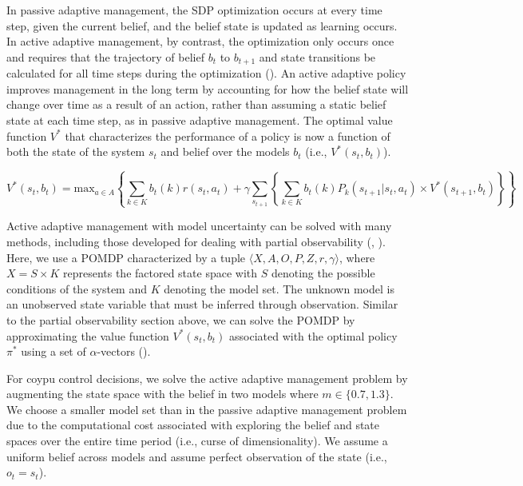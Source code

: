 \documentclass[
  11pt,
  a4paper,
]{article}
\begin{document}
In passive adaptive management, the SDP optimization occurs at every time step, given the current belief, and the belief state is updated as learning occurs. In active adaptive management, by contrast, the optimization only occurs once and requires that the trajectory of belief \(b_t\) to \(b_{t+1}\) and state transitions be calculated for all time steps during the optimization (). An active adaptive policy improves management in the long term by accounting for how the belief state will change over time as a result of an action, rather than assuming a static belief state at each time step, as in passive adaptive management. The optimal value function \(V^*\) that characterizes the performance of a policy is now a function of both the state of the system \(s_t\) and belief over the models \(b_t\) (i.e., \(V^*(s_t, b_t)\)).

\[
V^*(s_t,b_t) = \text{max}_{a \in A} \left\{ \sum_{k \in K}b_t(k)r(s_t, a_t) + \gamma \sum_{s_{t+1}} \left\{\sum_{k\in K}b_t(k)P_k(s_{t+1}|s_t, a_t) \times V^*(s_{t+1},b_t)\right\} \right\}
\]

Active adaptive management with model uncertainty can be solved with many methods, including those developed for dealing with partial observability (, ). Here, we use a POMDP characterized by a tuple \(〈X, A, O, P, Z, r, \gamma〉\), where \(X = S \times K\) represents the factored state space with \(S\) denoting the possible conditions of the system and \(K\) denoting the model set. The unknown model is an unobserved state variable that must be inferred through observation. Similar to the partial observability section above, we can solve the POMDP by approximating the value function \(V^*(s_t,b_t)\) associated with the optimal policy \(\pi^*\) using a set of \(\alpha\)-vectors ().

For coypu control decisions, we solve the active adaptive management problem by augmenting the state space with the belief in two models where \(m \in \{0.7, 1.3\}\). We choose a smaller model set than in the passive adaptive management problem due to the computational cost associated with exploring the belief and state spaces over the entire time period (i.e., curse of dimensionality). We assume a uniform belief across models and assume perfect observation of the state (i.e., \(o_t = s_t\)).
\end{document}
